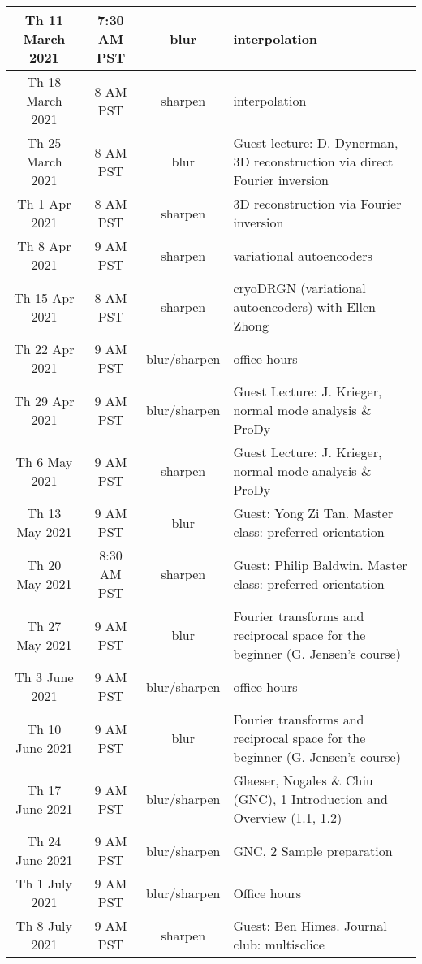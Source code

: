 \documentclass[11pt, oneside]{article}   	%
\begin{document}
\begin{center}
\begin{tabular}{|| c c c p{90mm} ||}
 \hline
Th 11 March 2021 & \tiny{7:30 AM PST} & blur & interpolation  \\ 
 \hline
 Th 18 March 2021 & \tiny{8 AM PST} & sharpen & interpolation  \\ 
 \hline
Th 25 March 2021 & \tiny{8 AM PST} & blur & \tiny{Guest lecture: D. Dynerman, 3D reconstruction via direct Fourier inversion}  \\ 
 \hline
Th 1 Apr 2021 & \tiny{8 AM PST} & sharpen & 3D reconstruction via  Fourier inversion  \\ 
 \hline
Th 8 Apr 2021 & \tiny{9 AM PST} & sharpen & variational autoencoders  \\ 
 \hline
Th 15 Apr 2021 & \tiny{8 AM PST} & sharpen & cryoDRGN (variational autoencoders) with Ellen Zhong  \\ 
 \hline
Th 22 Apr 2021 & \tiny{9 AM PST} & blur/sharpen & office hours  \\ 
 \hline
Th 29 Apr 2021 & \tiny{9 AM PST} & blur/sharpen & \tiny{Guest Lecture: J. Krieger, normal mode analysis \& ProDy}  \\ 
 \hline
Th 6 May 2021 & \tiny{9 AM PST} & sharpen & \tiny{Guest Lecture: J. Krieger, normal mode analysis \& ProDy} \\ 
 \hline
Th 13 May 2021 & \tiny{9 AM PST} & blur & \tiny{Guest: Yong Zi Tan. Master class: preferred orientation}  \\ 
 \hline
Th 20 May 2021 & \tiny{8:30 AM PST} & sharpen & \tiny{Guest: Philip Baldwin. Master class: preferred orientation}  \\ 
 \hline
Th 27 May 2021 & \tiny{9 AM PST} & blur & \tiny{Fourier transforms and reciprocal space for the beginner (G. Jensen's course)}  \\ 
 \hline
Th 3 June 2021 & \tiny{9 AM PST} & blur/sharpen & office hours  \\ 
 \hline
Th 10 June 2021 & \tiny{9 AM PST} & blur & \tiny{Fourier transforms and reciprocal space for the beginner (G. Jensen's course)}  \\
 \hline
Th 17 June 2021& \tiny{9 AM PST} & blur/sharpen & \tiny{Glaeser, Nogales \& Chiu (GNC), 1 Introduction and Overview (1.1, 1.2)}  \\ 
 \hline
Th 24 June 2021& \tiny{9 AM PST} & blur/sharpen & GNC, 2 Sample preparation  \\
 \hline
Th 1 July 2021& \tiny{9 AM PST} & blur/sharpen & Office hours \\ 
 \hline
Th 8 July 2021 & \tiny{9 AM PST} & sharpen & Guest: Ben Himes. Journal club: multisclice  \\ 

\end{tabular}
\end{center}
\end{document}
